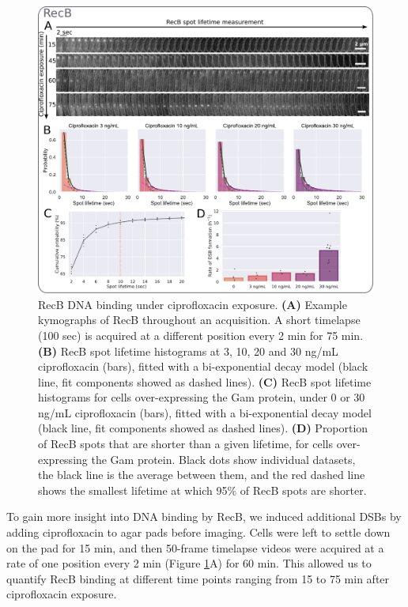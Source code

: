 \begin{figure}[htbp]
    \centering
    \includegraphics[width=.8\textwidth]{Figures/Fig2_RecB_binding.pdf}
    \caption{RecB DNA binding under ciprofloxacin exposure. \textbf{(A)} Example kymographs of RecB throughout an acquisition. A short timelapse (100 sec) is acquired at a different position every 2 min for 75 min. \textbf{(B)} RecB spot lifetime histograms at 3, 10, 20 and 30 ng/mL ciprofloxacin (bars), fitted with a bi-exponential decay model (black line, fit components showed as dashed lines). \textbf{(C)} RecB spot lifetime histograms for cells over-expressing the Gam protein, under 0 or 30 ng/mL ciprofloxacin (bars), fitted with a bi-exponential decay model (black line, fit components showed as dashed lines). \textbf{(D)} Proportion of RecB spots that are shorter than a given lifetime, for cells over-expressing the Gam protein. Black dots show individual datasets, the black line is the average between them, and the red dashed line shows the smallest lifetime at which 95\% of RecB spots are shorter.}
    \label{Fig:lifetime_fits}
\end{figure}

To gain more insight into DNA binding by RecB, we induced additional DSBs by adding ciprofloxacin to agar pads before imaging. Cells were left to settle down on the pad for 15 min, and then 50-frame timelapse videos were acquired at a rate of one position every 2 min (Figure \ref{Fig:lifetime_fits}A) for 60 min. This allowed us to quantify RecB binding at different time points ranging from 15 to 75 min after ciprofloxacin exposure.


